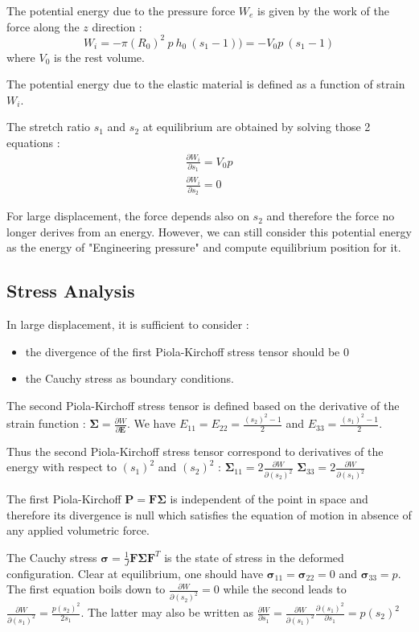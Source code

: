 \documentclass[a4paper,11pt]{article}
\newcommand{\strain}{{\mathbf E}}
\newcommand{\spk}{{\mathbf \Sigma}}
\newcommand{\cauchy}{{\mathbf \sigma}}
\newcommand{\fpk}{{\mathbf P}}
\newcommand{\defGrad}{{\mathbf F}}
\begin{document}
The potential energy due to the pressure force $W_e$ is given by the work of the force along the $z$ direction :
\[
W_i = -\pi (R_0)^2 ~p ~ h_0~(s_1 -1))= -V_0 p~(s_1 -1)
\]
where $V_0$ is the rest volume.

The potential energy due to the elastic material is defined as a function of strain $W_i$.

The stretch ratio $s_1$ and $s_2$ at equilibrium are obtained by solving those 2 equations :
\begin{align*}
\frac{\partial W_i}{\partial s_1} = V_0 p \\
\frac{\partial W_i}{\partial s_2} = 0 
\end{align*}

For large displacement, the force depends also on $s_2$ and therefore the force no longer derives from an energy.
However, we can still consider this potential energy as the energy of "Engineering pressure" and compute equilibrium position for it.

\subsection{Stress Analysis}

In large displacement, it is sufficient to consider :

\begin{itemize}
	\item the divergence of the first Piola-Kirchoff stress tensor should be 0
	\item the Cauchy stress as boundary conditions.
\end{itemize}

The second Piola-Kirchoff stress tensor is defined based on the derivative of the strain function : $\spk=\frac{\partial W}{\partial \strain}$.
We have $E_{11}=E_{22}=\frac{(s_2)^2-1}{2}$ and $E_{33}=\frac{(s_1)^2-1}{2}$.

Thus the second Piola-Kirchoff stress tensor correspond to derivatives of the energy with respect to $(s_1)^2$ and  $(s_2)^2$ : $\spk_{11}=2\frac{\partial W}{\partial (s_2)^2}$ $\spk_{33}=2\frac{\partial W}{\partial (s_1)^2}$ 

The first Piola-Kirchoff $\fpk=\defGrad \spk$ is independent of the point in space and therefore its divergence is null which satisfies the equation of motion in absence of any applied volumetric force. 

The Cauchy stress $\cauchy=\frac{1}{J} \defGrad \spk \defGrad^T$ is the state of stress in the deformed configuration. Clear at equilibrium, one should have $\cauchy_{11}=\cauchy_{22}=0$ and $\cauchy_{33}=p$. The first equation boils down to $\frac{\partial W}{\partial (s_2)^2}=0$ while the second leads to $\frac{\partial W}{\partial (s_1)^2}=\frac{p (s_2)^2}{2 s_1}$. The latter may also be written as $\frac{\partial W}{\partial s_1}=\frac{\partial W}{\partial (s_1)^2} \frac{\partial (s_1)^2}{\partial s_1}= p (s_2)^2$
\end{document}
